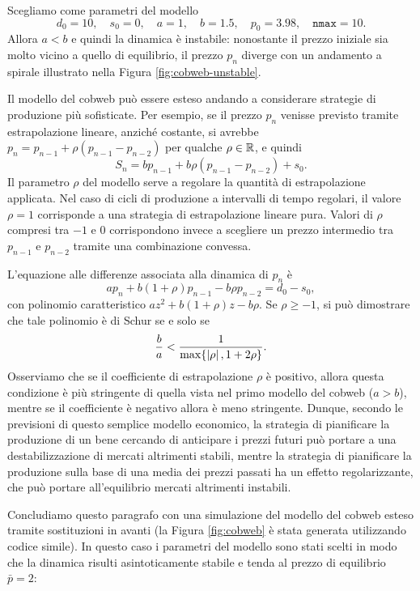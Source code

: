 \begin{esem}
Scegliamo come parametri del modello
\[
d_0 = 10, \quad
s_0 = 0, \quad
a = 1, \quad
b = 1.5, \quad
p_0 = 3.98, \quad
\texttt{nmax} = 10.
\]
Allora $a<b$ e quindi la dinamica è instabile: nonostante il prezzo iniziale
sia molto vicino a quello di equilibrio, il prezzo $p_n$ diverge con un
andamento a spirale illustrato nella Figura \ref{fig:cobweb-unstable}.
\end{esem}

Il modello del cobweb può essere esteso andando a considerare
strategie di produzione più sofisticate. Per esempio, se il prezzo
$p_n$ venisse previsto tramite estrapolazione lineare, anziché
costante, si avrebbe $p_n = p_{n-1} + \rho(p_{n-1}-p_{n-2})$
per qualche $\rho \in \mathbb{R}$, e quindi
\[
S_n = b p_{n-1} + b \rho(p_{n-1}-p_{n-2}) + s_0.
\]
Il parametro $\rho$ del modello serve a regolare la quantità
di estrapolazione applicata.
Nel caso di cicli di produzione a intervalli di tempo regolari,
il valore $\rho = 1$ corrisponde a una strategia di estrapolazione lineare pura.
Valori di $\rho$ compresi tra $-1$ e $0$ corrispondono invece a scegliere
un prezzo intermedio tra $p_{n-1}$ e $p_{n-2}$
tramite una combinazione convessa.

L'equazione alle differenze associata alla dinamica di $p_n$ è
\[
a p_n + b (1+\rho) p_{n-1} - b \rho p_{n-2} = d_0-s_0,
\]
con polinomio caratteristico $az^2 + b (1+\rho) z - b \rho$.
Se $\rho \geq -1$, si può dimostrare che tale polinomio è di Schur se e solo se
\[
\frac{b}{a} < \frac{1}{\max\{\left\lvert\rho\right\rvert,1+2\rho\}}.
\]
Osserviamo che se il coefficiente di estrapolazione $\rho$ è positivo,
allora questa condizione è più stringente di quella vista
nel primo modello del cobweb ($a>b$),
mentre se il coefficiente è negativo allora è meno stringente.
Dunque, secondo le previsioni di questo semplice modello economico,
la strategia di pianificare la produzione di un bene cercando di anticipare
i prezzi futuri può portare a una destabilizzazione di mercati altrimenti stabili,
mentre la strategia di pianificare la produzione sulla base di una media dei prezzi
passati ha un effetto regolarizzante, che può portare all'equilibrio
mercati altrimenti instabili.

Concludiamo questo paragrafo con una simulazione del
modello del cobweb esteso tramite sostituzioni in avanti
(la Figura \ref{fig:cobweb} è stata generata utilizzando codice simile).
In questo caso i parametri del modello sono stati scelti in modo
che la dinamica risulti asintoticamente stabile e tenda al prezzo
di equilibrio $\bar{p} = 2$:

